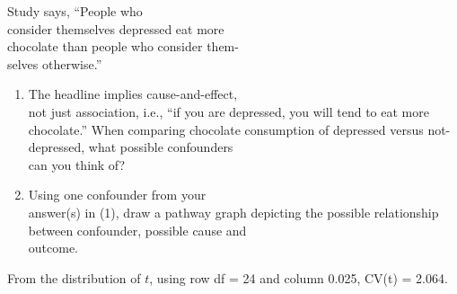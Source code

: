 \documentclass[11pt, chapterprefix=true]{scrbook}\usepackage[]{graphicx}\usepackage[]{color}
\begin{document}
\begin{exercises}
\begin{exercise}
	\end{exercise}

  \begin{exercise} %

Study says, ``People who \\ consider themselves depressed eat more \\ chocolate than people who consider them- \\ selves otherwise.''

\begin{enumerate}
\item The headline implies cause-and-effect, \\ not just association, i.e., ``if you are depressed, you will tend to eat more chocolate.''   When comparing chocolate consumption of depressed versus not- \\ depressed, what possible confounders \\ can you think of?
  \item Using one confounder from your \\ answer(s) in (1), draw a pathway graph depicting the possible relationship between confounder, possible cause and \\ outcome.
\end{enumerate}
  \end{exercise}
  \begin{solution}  %


    From the distribution of $t$, using row df = 24 and column 0.025, CV(t) = 2.064.
  \end{solution}


\end{exercises}
\end{document}
